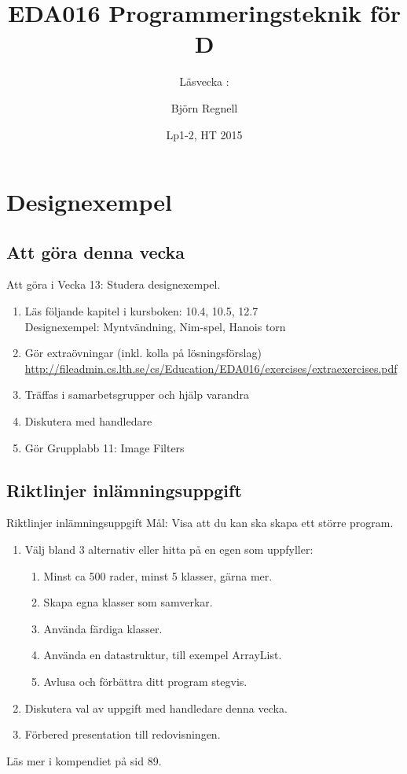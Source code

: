 \documentclass{lecturenotes}
\title[Föreläsningsanteckningar EDA016, 2015]{EDA016 Programmeringsteknik för D}
\subtitle{Läsvecka \vecka: \tema}
\author{Björn Regnell}
\institute{Datavetenskap, LTH}
\date{Lp1-2, HT 2015}
\renewcommand{\vecka}{13}
\newcommand{\tema}{Designexempel}
\begin{document}
\frame{\titlepage}
\setnextsection{\vecka}
\section[Vecka \vecka: \tema]{\tema}
\frame{\tableofcontents}

\subsection{Att göra denna vecka}
\begin{Slide}{Att göra i Vecka \vecka: Studera designexempel.}
\begin{enumerate}
\item Läs följande kapitel i kursboken:  10.4, 10.5, 12.7 \\  
  Designexempel: Myntvändning, Nim-spel, Hanois torn
\item Gör extraövningar (inkl. kolla på lösningsförslag) \\ {\scriptsize \url{http://fileadmin.cs.lth.se/cs/Education/EDA016/exercises/extraexercises.pdf}}
\item Träffas i samarbetsgrupper och hjälp varandra 
\item Diskutera  med handledare 
\item Gör Grupplabb 11: Image Filters
\end{enumerate}
\end{Slide}

\subsection{Riktlinjer inlämningsuppgift}
\begin{Slide}{Riktlinjer inlämningsuppgift}
Mål: Visa att du kan ska skapa ett större program. 
\begin{enumerate}

\item Välj bland 3 alternativ eller hitta på en egen som uppfyller: 
\begin{enumerate}
\item Minst ca 500 rader, minst 5 klasser, gärna mer.
\item Skapa egna klasser som samverkar.
\item Använda färdiga klasser.
\item Använda en datastruktur, till exempel ArrayList.
\item Avlusa och förbättra ditt program stegvis.
\end{enumerate}

\item Diskutera val av uppgift med handledare denna vecka.

\item Förbered presentation till redovisningen.
\end{enumerate}
Läs mer i kompendiet på sid 89.
\end{Slide}
\end{document}
